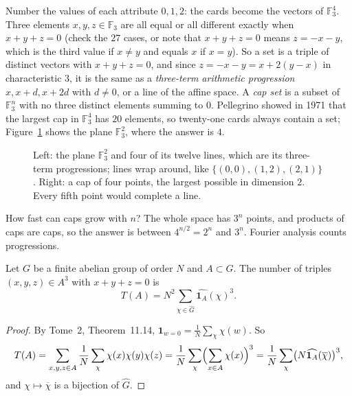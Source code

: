 Number the values of each attribute $0,1,2$: the cards become the vectors of $\mathbb F_3^4$. Three elements $x,y,z\in\mathbb F_3$ are all
equal or all different exactly when $x+y+z=0$ (check the $27$ cases, or note that $x+y+z=0$ means $z=-x-y$, which is the third value
if $x\ne y$ and equals $x$ if $x=y$). So a set is a triple of distinct vectors with $x+y+z=0$, and since $z=-x-y=x+2(y-x)$ in
characteristic $3$, it is the same as a \emph{three-term arithmetic progression} $x,x+d,x+2d$ with $d\ne0$, or a line of the affine space.
A \emph{cap set} is a subset of $\mathbb F_3^n$ with no three distinct elements summing to $0$. Pellegrino showed in 1971 that the largest cap in
$\mathbb F_3^4$ has $20$ elements, so twenty-one cards always contain a set; Figure~\ref{fig:cap} shows the plane $\mathbb F_3^2$, where the answer is $4$.

\begin{figure}[ht]
\centering
{}
\caption{Left: the plane $\mathbb F_3^2$ and four of its twelve lines, which are its three-term progressions; lines wrap around, like
$\{(0,0),(1,2),(2,1)\}$. Right: a cap of four points, the largest possible in dimension $2$. Every fifth point would complete a line.}
\label{fig:cap}
\end{figure}

How fast can caps grow with $n$? The whole space has $3^n$ points, and products of caps are caps, so the answer is between
$4^{n/2}=2^n$ and $3^n$. Fourier analysis counts progressions.

\begin{lemma}\label{lem:capcount}
Let $G$ be a finite abelian group of order $N$ and $A\subset G$. The number of triples $(x,y,z)\in A^3$ with $x+y+z=0$ is
\[T(A)=N^2\sum_{\chi\in\widehat G}\widehat{\mathbf 1_A}(\chi)^3.\]
\end{lemma}
\begin{proof}
By Tome~2, Theorem~11.14, $\mathbf 1_{w=0}=\frac1N\sum_\chi\chi(w)$. So
\[T(A)=\sum_{x,y,z\in A}\frac1N\sum_\chi\chi(x)\chi(y)\chi(z)=\frac1N\sum_\chi\Bigl(\sum_{x\in A}\chi(x)\Bigr)^3=\frac1N\sum_\chi\bigl(N\widehat{\mathbf 1_A}(\overline\chi)\bigr)^3,\]
and $\chi\mapsto\overline\chi$ is a bijection of $\widehat G$.
\end{proof}

